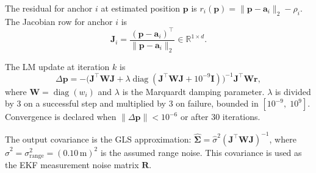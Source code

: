
The residual for anchor $i$ at estimated position $\mathbf{p}$ is
$r_i(\mathbf{p}) = \|\mathbf{p} - \mathbf{a}_i\|_2 - \rho_i$.
The Jacobian row for anchor $i$ is
\begin{equation}
  \mathbf{J}_i = \frac{(\mathbf{p} - \mathbf{a}_i)^\top}{\|\mathbf{p} - \mathbf{a}_i\|_2}
  \in \mathbb{R}^{1 \times d}.
\end{equation}

The LM update at iteration $k$ is
\begin{equation}
  \Delta\mathbf{p} = -\bigl(\mathbf{J}^\top \mathbf{W} \mathbf{J}
    + \lambda \operatorname{diag}(\mathbf{J}^\top \mathbf{W} \mathbf{J} + 10^{-9}\mathbf{I})\bigr)^{-1}
    \mathbf{J}^\top \mathbf{W} \mathbf{r},
\end{equation}
where $\mathbf{W} = \operatorname{diag}(w_i)$ and $\lambda$ is the
Marquardt damping parameter.
$\lambda$ is divided by 3 on a successful step and multiplied by 3 on failure,
bounded in $[10^{-9},\;10^9]$.
Convergence is declared when $\|\Delta\mathbf{p}\| < 10^{-6}$ or after 30 iterations.

The output covariance is the GLS approximation:
$\hat{\bm{\Sigma}} = \hat{\sigma}^2 (\mathbf{J}^\top \mathbf{W} \mathbf{J})^{-1}$,
where $\hat{\sigma}^2 = \sigma_{\text{range}}^2 = (0.10\,\text{m})^2$ is the assumed
range noise.
This covariance is used as the EKF measurement noise matrix $\mathbf{R}$.
